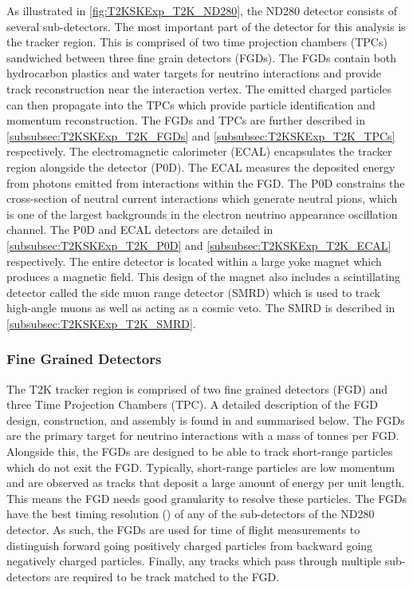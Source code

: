 As illustrated in \autoref{fig:T2KSKExp_T2K_ND280}, the ND280 detector consists of several sub-detectors. The most important part of the detector for this analysis is the tracker region. This is comprised of two time projection chambers (TPCs) sandwiched between three fine grain detectors (FGDs). The FGDs contain both hydrocarbon plastics and water targets for neutrino interactions and provide track reconstruction near the interaction vertex. The emitted charged particles can then propagate into the TPCs which provide particle identification and momentum reconstruction. The FGDs and TPCs are further described in \autoref{subsubsec:T2KSKExp_T2K_FGDs} and \autoref{subsubsec:T2KSKExp_T2K_TPCs} respectively. The electromagnetic calorimeter (ECAL) encapsulates the tracker region alongside the  detector (P0D). The ECAL measures the deposited energy from photons emitted from interactions within the FGD. The P0D constrains the cross-section of neutral current interactions which generate neutral pions, which is one of the largest backgrounds in the electron neutrino appearance oscillation channel. The P0D and ECAL detectors are detailed in \autoref{subsubsec:T2KSKExp_T2K_P0D} and \autoref{subsubsec:T2KSKExp_T2K_ECAL} respectively. The entire detector is located within a large yoke magnet which produces a  magnetic field. This design of the magnet also includes a scintillating detector called the side muon range detector (SMRD) which is used to track high-angle muons as well as acting as a cosmic veto. The SMRD is described in \autoref{subsubsec:T2KSKExp_T2K_SMRD}.  

\subsubsection{Fine Grained Detectors}
\label{subsubsec:T2KSKExp_T2K_FGDs}

The T2K tracker region is comprised of two fine grained detectors (FGD) and three Time Projection Chambers (TPC). A detailed description of the FGD design, construction, and assembly is found in \cite{Amaudruz2012} and summarised below. The FGDs are the primary target for neutrino interactions with a mass of  tonnes per FGD.
Alongside this, the FGDs are designed to be able to track short-range particles which do not exit the FGD. Typically, short-range particles are low momentum and are observed as tracks that deposit a large amount of energy per unit length. This means the FGD needs good granularity to resolve these particles. The FGDs have the best timing resolution () of any of the sub-detectors of the ND280 detector. As such, the FGDs are used for time of flight measurements to distinguish forward going positively charged particles from backward going negatively charged particles. Finally, any tracks which pass through multiple sub-detectors are required to be track matched to the FGD.

